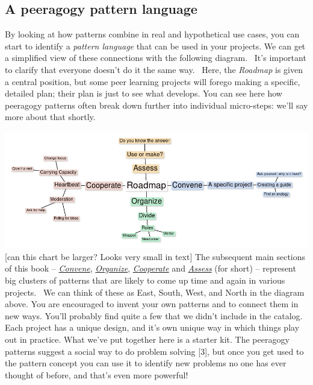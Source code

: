 \hypertarget{a-peeragogy-pattern-language}{%
\subsection{A peeragogy pattern
language}\label{a-peeragogy-pattern-language}}

By looking at how patterns combine in real and hypothetical use cases,
you can start to identify a \emph{pattern language} that can be used in
your projects. We can get a simplified view of these connections with
the following diagram.~ It's important to clarify that everyone doesn't
do it the same way.~ Here, the \emph{Roadmap} is given a central
position, but some peer learning projects will forego making a specific,
detailed plan; their plan is just to see what develops. You can see here
how peeragogy patterns often break down further into individual
micro-steps: we'll say more about that shortly.

\includegraphics{images/pattern-language.jpg} {[}can this chart be
larger? Looks very small in text{]} The subsequent main sections of this
book -- \href{http://peeragogy.org/convene/}{\emph{Convene}},
\href{http://peeragogy.org/organize/}{\emph{Organize}},
\href{http://peeragogy.org/facilitate/}{\emph{Cooperate}} and
\href{http://peeragogy.org/assessment/}{\emph{Assess}} (for short) --
represent big clusters of patterns that are likely to come up time and
again in various projects.~ We can think of these as East, South, West,
and North in the diagram above. You are encouraged to invent your own
patterns and to connect them in new ways. You'll probably find quite a
few that we didn't include in the catalog. Each project has a unique
design, and it's own unique way in which things play out in practice.
What we've put together here is a starter kit. The peeragogy patterns
suggest a social way to do problem solving {[}3{]}, but once you get
used to the pattern concept you can use it to identify new problems no
one has ever thought of before, and that's even more powerful!

